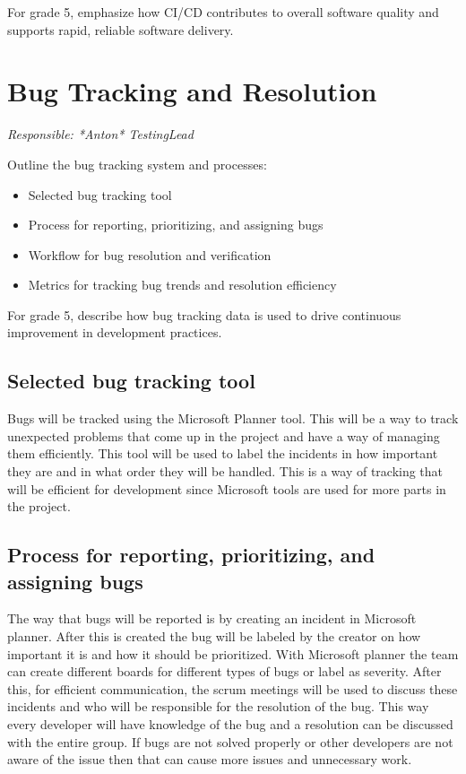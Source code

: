 \documentclass{article}
\begin{document}
For grade 5, emphasize how CI/CD contributes to overall software quality and supports rapid, reliable software delivery.

\newpage
\section{Bug Tracking and Resolution}
\textit{Responsible: *Anton* TestingLead}

Outline the bug tracking system and processes:

\begin{itemize}
    \item Selected bug tracking tool
    \item Process for reporting, prioritizing, and assigning bugs
    \item Workflow for bug resolution and verification
    \item Metrics for tracking bug trends and resolution efficiency
\end{itemize}

For grade 5, describe how bug tracking data is used to drive continuous improvement in development practices.

\subsection{Selected bug tracking tool} 
Bugs will be tracked using the Microsoft Planner tool. This will be a way to track unexpected problems that come up in the project and have a way of managing them efficiently. This tool will be used to label the incidents in how important they are and in what order they will be handled. This is a way of tracking that will be efficient for development since Microsoft tools are used for more parts in the project. 


\subsection{Process for reporting, prioritizing, and assigning bugs}
The way that bugs will be reported is by creating an incident in Microsoft planner. After this is created the bug will be labeled by the creator on how important it is and how it should be prioritized. With Microsoft planner the team can create different boards for different types of bugs or label as severity. After this, for efficient communication, the scrum meetings will be used to discuss these incidents and who will be responsible for the resolution of the bug. This way every developer will have knowledge of the bug and a resolution can be discussed with the entire group. If bugs are not solved properly or other developers are not aware of the issue then that can cause more issues and unnecessary work.
\end{document}
